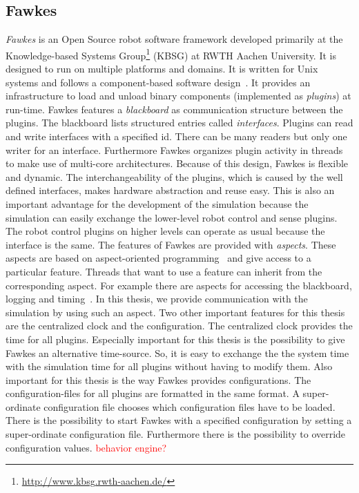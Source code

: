 \subsection{Fawkes}
\textit{Fawkes} is an Open Source robot software framework developed primarily at the Knowledge-based Systems Group\footnote{\url{http://www.kbsg.rwth-aachen.de/}} (KBSG) at RWTH Aachen University. It is designed to run on multiple platforms and domains. It is written for Unix systems and follows a component-based software design~\cite{FawkesDesign}. It provides an infrastructure to load and unload binary components (implemented as \textit{plugins}) at run-time. Fawkes features a \textit{blackboard} as communication structure between the plugins. The blackboard lists structured entries called \textit{interfaces}. Plugins can read and write interfaces with a specified id. There can be many readers but only one writer for an interface. Furthermore Fawkes organizes plugin activity in threads to make use of multi-core architectures. Because of this design, Fawkes is flexible and dynamic. The interchangeability of the plugins, which is caused by the well defined interfaces, makes hardware abstraction and reuse easy. This is also an important advantage for the development of the simulation because the simulation can easily exchange the lower-level robot control and sense plugins. The robot control plugins on higher levels can operate as usual because the interface is the same. The features of Fawkes are provided with \textit{aspects}. These aspects are based on aspect-oriented programming~\cite{aspect_oriented} and give access to a particular feature. Threads that want to use a feature can inherit from the corresponding aspect. For example there are aspects for accessing the blackboard, logging and timing~\cite{tnthesis}. In this thesis, we provide communication with the simulation by using such an aspect. Two other important features for this thesis are the centralized clock and the configuration. The centralized clock provides the time for all plugins. Especially important for this thesis is the possibility to give Fawkes an alternative time-source. So, it is easy to exchange the the system time with the simulation time for all plugins without having to modify them. Also important for this thesis is the way Fawkes provides configurations. The configuration-files for all plugins are formatted in the same format. A super-ordinate configuration file chooses which configuration files have to be loaded. There is the possibility to start Fawkes with a specified configuration by setting a super-ordinate configuration file. Furthermore there is the possibility to override configuration values. \textcolor{red}{behavior engine?}\\
